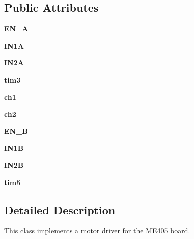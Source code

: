 \subsection*{Public Attributes}
\begin{DoxyCompactItemize}
\item 
\mbox{\label{classmotor_1_1_motor_driver_a82c4f7d2d3b311235273ff976d300d1c}} 
{\bfseries E\+N\+\_\+A}
\item 
\mbox{\label{classmotor_1_1_motor_driver_ae5f62b22dfa14124343b8c2b58524950}} 
{\bfseries I\+N1A}
\item 
\mbox{\label{classmotor_1_1_motor_driver_a0d69b582264c0192f6288cfd1a603de8}} 
{\bfseries I\+N2A}
\item 
\mbox{\label{classmotor_1_1_motor_driver_ab91b09598c1e2ef3b1e8b29b20b1604d}} 
{\bfseries tim3}
\item 
\mbox{\label{classmotor_1_1_motor_driver_ab59ff180f9593d716a60d0177cd8564e}} 
{\bfseries ch1}
\item 
\mbox{\label{classmotor_1_1_motor_driver_af47581f527f4163d62810c617e081001}} 
{\bfseries ch2}
\item 
\mbox{\label{classmotor_1_1_motor_driver_a15a79f7d45ea38ddefa0c6d50fc64287}} 
{\bfseries E\+N\+\_\+B}
\item 
\mbox{\label{classmotor_1_1_motor_driver_a97599c45bf1e521130f3b58f85bc8615}} 
{\bfseries I\+N1B}
\item 
\mbox{\label{classmotor_1_1_motor_driver_a1a55eacef25fa3eacab8988b5e0b9a44}} 
{\bfseries I\+N2B}
\item 
\mbox{\label{classmotor_1_1_motor_driver_ac0863a3810b1ec1c82d0b8f3a167ef04}} 
{\bfseries tim5}
\end{DoxyCompactItemize}


\subsection{Detailed Description}
\begin{DoxyVerb}This class implements a motor driver for the
ME405 board. \end{DoxyVerb}
 

